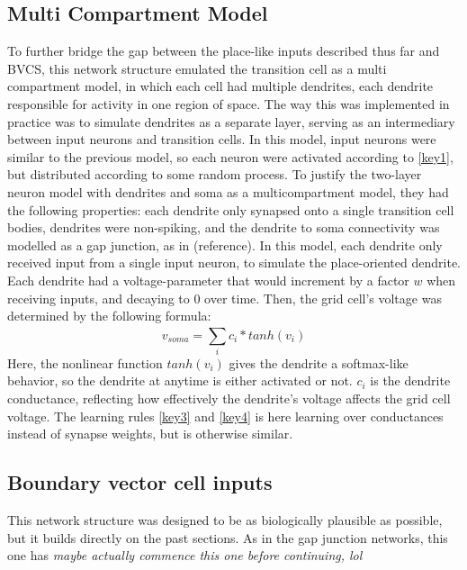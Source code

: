 \documentclass{article}
\begin{document}
    \subsection{Multi Compartment Model}
    To further bridge the gap between the place-like inputs described thus far and BVCS, this network structure emulated the transition cell as a multi compartment model, in which each cell had multiple dendrites, each dendrite responsible for activity in one region of space. The way this was implemented in practice was to simulate dendrites as a separate layer, serving as an intermediary between input neurons and transition cells. In this model, input neurons were similar to the previous model, so each neuron were activated according to \ref*{key1}, but distributed according to some random process. To justify the two-layer neuron model with dendrites and soma as a multicompartment model, they had the following properties: each dendrite only synapsed onto a single transition cell bodies, dendrites were non-spiking, and the dendrite to soma connectivity was modelled as a gap junction, as in (reference). In this model, each dendrite only received input from a single input neuron, to simulate the place-oriented dendrite. Each dendrite had a voltage-parameter that would increment by a factor \(w\) when receiving inputs, and decaying to 0 over time. Then, the grid cell's voltage was determined by the following formula: \[ v_{soma} = \sum_{i}^{} c_i * tanh(v_i)\] Here, the nonlinear function \(tanh(v_i)\) gives the dendrite a softmax-like behavior, so the dendrite at anytime is either activated or not. \(c_i\) is the dendrite conductance, reflecting how effectively the dendrite's voltage affects the grid cell voltage. The learning rules \ref*{key3} and \ref*{key4} is here learning over conductances instead of synapse weights, but is otherwise similar.

    \subsection{Boundary vector cell inputs}
    This network structure was designed to be as biologically plausible as possible, but it builds directly on the past sections. As in the gap junction networks, this one has \textit{maybe actually commence this one before continuing, lol}


{}

\end{document}
